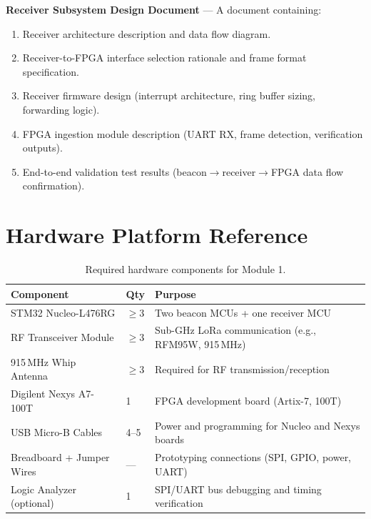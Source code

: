 \documentclass[11pt,letterpaper]{article}
\begin{document}
	\begin{tcolorbox}[deliverable={Week 4 Deliverable}]
		\textbf{Receiver Subsystem Design Document} --- A document containing:
		\begin{enumerate}
			\item Receiver architecture description and data flow diagram.
			\item Receiver-to-FPGA interface selection rationale and frame format specification.
			\item Receiver firmware design (interrupt architecture, ring buffer sizing, forwarding logic).
			\item FPGA ingestion module description (UART RX, frame detection, verification outputs).
			\item End-to-end validation test results (beacon$\rightarrow$receiver$\rightarrow$FPGA data flow confirmation).
		\end{enumerate}
	\end{tcolorbox}
	
	\newpage
	\section{Hardware Platform Reference}
	\label{sec:hardware}
	
	\begin{table}[ht!]
		\centering
		\caption{Required hardware components for Module 1.}
		\label{tab:hardware}
		\renewcommand{\arraystretch}{1.3}
		\begin{tabularx}{\textwidth}{l l X}
			\toprule
			\textbf{Component} & \textbf{Qty} & \textbf{Purpose} \\
			\midrule
			STM32 Nucleo-L476RG & $\geq 3$ & Two beacon MCUs + one receiver MCU \\
			RF Transceiver Module & $\geq 3$ & Sub-GHz LoRa communication (e.g., RFM95W, 915\,MHz) \\
			915\,MHz Whip Antenna & $\geq 3$ & Required for RF transmission/reception \\
			Digilent Nexys A7-100T & 1 & FPGA development board (Artix-7, 100T) \\
			USB Micro-B Cables & 4--5 & Power and programming for Nucleo and Nexys boards \\
			Breadboard + Jumper Wires & --- & Prototyping connections (SPI, GPIO, power, UART) \\
			Logic Analyzer (optional) & 1 & SPI/UART bus debugging and timing verification \\
			\bottomrule
		\end{tabularx}
	\end{table}
	
\end{document}
